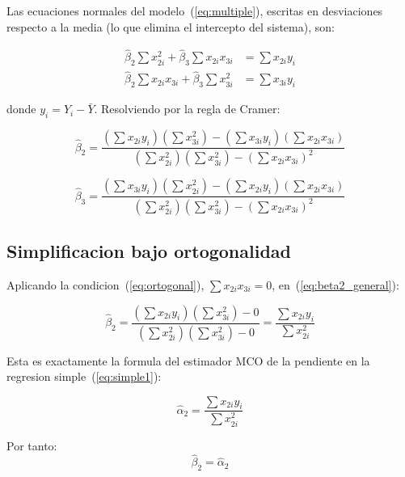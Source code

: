 \documentclass[12pt, letterpaper]{article}
\theoremstyle{remark}
\begin{document}
Las ecuaciones normales del modelo~(\ref{eq:multiple}), escritas en desviaciones
respecto a la media (lo que elimina el intercepto del sistema), son:

\begin{align}
  \hat\beta_2 \sum x_{2i}^2 + \hat\beta_3 \sum x_{2i} x_{3i}
    &= \sum x_{2i} y_i
  \label{eq:normal1}\\
  \hat\beta_2 \sum x_{2i} x_{3i} + \hat\beta_3 \sum x_{3i}^2
    &= \sum x_{3i} y_i
  \label{eq:normal2}
\end{align}

donde $y_i = Y_i - \bar Y$. Resolviendo por la regla de Cramer:

\begin{equation}
  \hat\beta_2
    = \frac{(\sum x_{2i} y_i)(\sum x_{3i}^2)
            - (\sum x_{3i} y_i)(\sum x_{2i} x_{3i})}
           {(\sum x_{2i}^2)(\sum x_{3i}^2) - (\sum x_{2i} x_{3i})^2}
  \label{eq:beta2_general}
\end{equation}

\begin{equation}
  \hat\beta_3
    = \frac{(\sum x_{3i} y_i)(\sum x_{2i}^2)
            - (\sum x_{2i} y_i)(\sum x_{2i} x_{3i})}
           {(\sum x_{2i}^2)(\sum x_{3i}^2) - (\sum x_{2i} x_{3i})^2}
  \label{eq:beta3_general}
\end{equation}

\subsection{Simplificacion bajo ortogonalidad}

Aplicando la condicion~(\ref{eq:ortogonal}), $\sum x_{2i} x_{3i} = 0$,
en~(\ref{eq:beta2_general}):

\begin{equation}
  \hat\beta_2
    = \frac{(\sum x_{2i} y_i)(\sum x_{3i}^2) - 0}
           {(\sum x_{2i}^2)(\sum x_{3i}^2) - 0}
    = \frac{\sum x_{2i} y_i}{\sum x_{2i}^2}
  \label{eq:beta2_ortogonal}
\end{equation}

Esta es exactamente la formula del estimador MCO de la pendiente en la
regresion simple~(\ref{eq:simple1}):

\begin{equation}
  \hat\alpha_2 = \frac{\sum x_{2i} y_i}{\sum x_{2i}^2}
  \label{eq:alpha2}
\end{equation}

Por tanto:
\begin{equation}
  \boxed{\hat\beta_2 = \hat\alpha_2}
  \label{eq:igual_beta2}
\end{equation}
\end{document}
